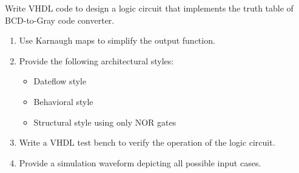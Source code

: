 \documentclass{article}
\begin{document}


\begin{Q}
    {
        Write VHDL code to design a logic circuit that implements the truth table of BCD-to-Gray
        code converter.
        \begin{enumerate}
            \item Use Karnaugh maps to simplify the output function.
            \item   Provide the following architectural styles:
                  \begin{itemize}
                      \item Dateflow style
                      \item  Behavioral style
                      \item  Structural style using only NOR gates
                  \end{itemize}
            \item  Write a VHDL test bench to verify the operation of the logic circuit.
            \item Provide a simulation waveform depicting all possible input cases.
        \end{enumerate}
    }
\end{Q}

\end{document}
